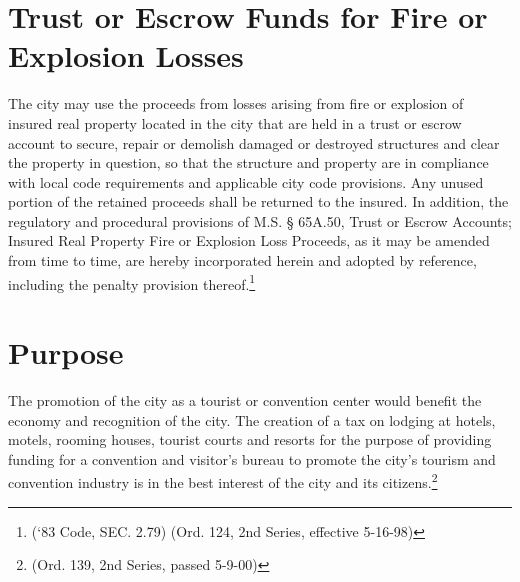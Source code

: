 \section{Trust or Escrow Funds for Fire or Explosion Losses}
The city may use the proceeds from losses arising from fire or explosion of insured real property located in the city that are held in a trust or escrow account to secure, repair or demolish damaged or destroyed structures and clear the property in question, so that the structure and property are in compliance with local code requirements and applicable city code provisions.  Any unused portion of the retained proceeds shall be returned to the insured.  In addition, the regulatory and procedural provisions of M.S. §  65A.50, Trust or Escrow Accounts; Insured Real Property Fire or Explosion Loss Proceeds, as it may be amended from time to time, are hereby incorporated herein and adopted by reference, including the penalty provision thereof.\footnote{(‘83 Code, SEC. 2.79)  (Ord. 124, 2nd Series, effective 5-16-98)}\\


\setcounter{section}{14}
\section{Purpose}
The promotion of the city as a tourist or convention center would benefit the economy and recognition of the city.  The creation of a tax on lodging at hotels, motels, rooming houses, tourist courts and resorts for the purpose of providing funding for a convention and visitor’s bureau to promote the city’s tourism and convention industry is in the best interest of the city and its citizens.\footnote{(Ord. 139, 2nd Series, passed 5-9-00)}
